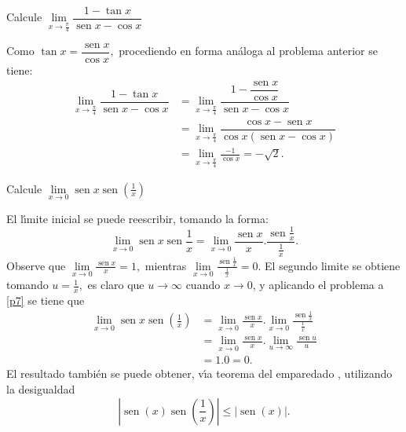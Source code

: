 \begin{example}
Calcule $\lim\limits_{x\rightarrow\frac{\pi}{4}}\dfrac{1-\tan x}%
{\operatorname{sen}x-\cos x}$
\end{example}

\begin{sol}
Como $\tan x=\dfrac{\operatorname{sen}x}{\cos x},$ procediendo en forma
an\'{a}loga al problema anterior se tiene:
\begin{align*}
\lim\limits_{x\rightarrow\frac{\pi}{4}}\dfrac{1-\tan x}{\operatorname{sen}%
x-\cos x}  &  =\lim\limits_{x\rightarrow\frac{\pi}{4}}\dfrac{1-\dfrac
{\operatorname{sen}x}{\cos x}}{\operatorname{sen}x-\cos x}\\
&  =\lim\limits_{x\rightarrow\frac{\pi}{4}}\dfrac{\cos x-\operatorname{sen}%
x}{\cos x\left(  \operatorname{sen}x-\cos x\right)  }\\
&  =\lim\limits_{x\rightarrow\frac{\pi}{4}}\frac{-1}{\cos x}=-\sqrt{2}.
\end{align*}

\end{sol}

\begin{example}
Calcule $\lim\limits_{x\rightarrow0}\operatorname{sen}x\operatorname{sen}%
\left(  \frac{1}{x}\right)  $
\end{example}

\begin{sol}
El l\'{\i}mite inicial se puede reescribir, tomando la forma:%
\[
\lim\limits_{x\rightarrow0}\operatorname{sen}x\operatorname{sen}\frac{1}%
{x}=\lim\limits_{x\rightarrow0}\frac{\operatorname{sen}x}{x}.\frac
{\operatorname{sen}\frac{1}{x}}{\frac{1}{x}}.
\]
Observe que $\lim\limits_{x\rightarrow0}\frac{\operatorname{sen}x}{x}=1,$
mientras $\lim\limits_{x\rightarrow0}\frac{\operatorname{sen}\frac{1}{x}%
}{\frac{1}{x}}=0$. El segundo limite se obtiene tomando $u=\frac{1}{x},$ es
claro que $u\rightarrow\infty$ cuando $x\rightarrow0$, y aplicando el problema
a \ref{p7} se tiene que%
\begin{align*}
\lim\limits_{x\rightarrow0}\operatorname{sen}x\operatorname{sen}\left(
\frac{1}{x}\right)   &  =\lim\limits_{x\rightarrow0}\frac{\operatorname{sen}%
x}{x}.\lim\limits_{x\rightarrow0}\frac{\operatorname{sen}\frac{1}{x}}{\frac
{1}{x}}\\
&  =\lim\limits_{x\rightarrow0}\frac{\operatorname{sen}x}{x}.\lim
\limits_{u\rightarrow\infty}\frac{\operatorname{sen}u}{u}\\
&  =1.0=0.
\end{align*}
El resultado tambi\'{e}n se puede obtener, v\'{\i}a teorema del emparedado%
%
, utilizando la desigualdad
\[
\left\vert \operatorname{sen}\left(  x\right)  \operatorname{sen}\left(
\frac{1}{x}\right)  \right\vert \leq\left\vert \operatorname{sen}\left(
x\right)  \right\vert .
\]

\end{sol}

